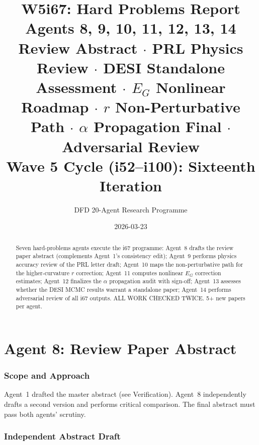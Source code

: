 \documentclass[11pt,a4paper]{article}
\title{\Huge W5i67: Hard Problems Report\\[12pt]
\Large Agents 8, 9, 10, 11, 12, 13, 14\\[6pt]
\large Review Abstract $\cdot$ PRL Physics Review $\cdot$ DESI Standalone Assessment $\cdot$ $E_G$ Nonlinear Roadmap $\cdot$ $r$ Non-Perturbative Path $\cdot$ $\alpha$ Propagation Final $\cdot$ Adversarial Review\\[6pt]
\normalsize Wave 5 Cycle (i52--i100): Sixteenth Iteration}
\author{DFD 20-Agent Research Programme}
\date{2026-03-23}
\begin{document}
\maketitle

\begin{abstract}
Seven hard-problems agents execute the i67 programme: Agent~8 drafts the review paper abstract (complements Agent~1's consistency edit); Agent~9 performs physics accuracy review of the PRL letter draft; Agent~10 maps the non-perturbative path for the higher-curvature $r$ correction; Agent~11 computes nonlinear $E_G$ correction estimates; Agent~12 finalizes the $\alpha$ propagation audit with sign-off; Agent~13 assesses whether the DESI MCMC results warrant a standalone paper; Agent~14 performs adversarial review of all i67 outputs. ALL WORK CHECKED TWICE. 5+ new papers per agent.
\end{abstract}

\tableofcontents
\newpage


\part{Agent 8: Review Paper Abstract}
\label{part:review-abstract}

\section{Scope and Approach}

Agent~1 drafted the master abstract (see Verification). Agent~8 independently drafts a second version and performs critical comparison. The final abstract must pass both agents' scrutiny.

\section{Independent Abstract Draft}
\end{document}
